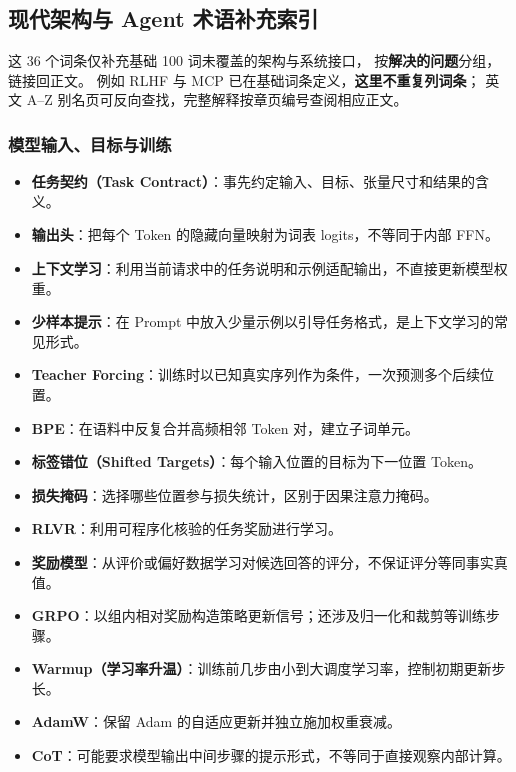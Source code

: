 \subsection{现代架构与 Agent 术语补充索引}
\label{intro:24b-modern-lexicon}

这 36 个词条仅补充基础 100 词未覆盖的架构与系统接口，
按\textbf{解决的问题}分组，链接回正文。
例如 RLHF 与 MCP 已在基础词条定义，\textbf{这里不重复列词条}；
英文 A--Z 别名页可反向查找，完整解释按章页编号查阅相应正文。

\subsubsection*{模型输入、目标与训练}
\begin{itemize}
\item \textbf{任务契约（Task Contract）}：事先约定输入、目标、张量尺寸和结果的含义。 
\item \textbf{输出头}：把每个 Token 的隐藏向量映射为词表 logits，不等同于内部 FFN。 
\item \textbf{上下文学习}：利用当前请求中的任务说明和示例适配输出，不直接更新模型权重。 
\item \textbf{少样本提示}：在 Prompt 中放入少量示例以引导任务格式，是上下文学习的常见形式。 
\item \textbf{Teacher Forcing}：训练时以已知真实序列作为条件，一次预测多个后续位置。 
\item \textbf{BPE}：在语料中反复合并高频相邻 Token 对，建立子词单元。 
\item \textbf{标签错位（Shifted Targets）}：每个输入位置的目标为下一位置 Token。 
\item \textbf{损失掩码}：选择哪些位置参与损失统计，区别于因果注意力掩码。 
\item \textbf{RLVR}：利用可程序化核验的任务奖励进行学习。 
\item \textbf{奖励模型}：从评价或偏好数据学习对候选回答的评分，不保证评分等同事实真值。 
\item \textbf{GRPO}：以组内相对奖励构造策略更新信号；还涉及归一化和裁剪等训练步骤。 
\item \textbf{Warmup（学习率升温）}：训练前几步由小到大调度学习率，控制初期更新步长。 
\item \textbf{AdamW}：保留 Adam 的自适应更新并独立施加权重衰减。 
\item \textbf{CoT}：可能要求模型输出中间步骤的提示形式，不等同于直接观察内部计算。 
\end{itemize}

